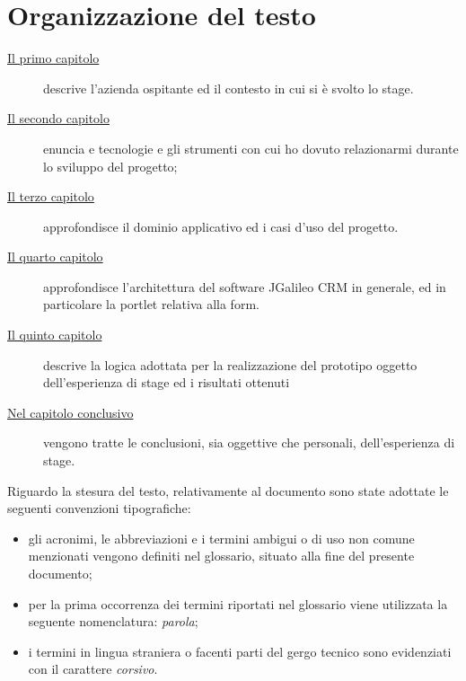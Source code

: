 \cleardoublepage
{}
{}
\begingroup
\let\clearpage\relax
\let\cleardoublepage\relax
\let\cleardoublepage\relax


\chapter*{Organizzazione del testo}

\begin{description}
    \item[{\hyperref[cap:introduzione]{Il primo capitolo}}] descrive l'azienda ospitante ed il contesto in cui si è svolto lo stage.

    \item[{\hyperref[cap:tecnologie-strumenti]{Il secondo capitolo}}] enuncia e tecnologie e gli strumenti con cui ho dovuto relazionarmi durante lo sviluppo del progetto;
    
    \item[{\hyperref[cap:descrizione-stage]{Il terzo capitolo}}] approfondisce il dominio applicativo ed i casi d'uso del progetto.
    
    \item[{\hyperref[cap:progettazione]{Il quarto capitolo}}] approfondisce l'architettura del software JGalileo CRM in generale, ed in particolare la portlet relativa alla form.    
    \item[{\hyperref[cap:sviluppo-prototipo]{Il quinto capitolo}}] descrive la logica adottata per la realizzazione del prototipo oggetto dell'esperienza di stage ed i risultati ottenuti
    \item[{\hyperref[cap:conclusioni]{Nel capitolo conclusivo}}] vengono tratte le conclusioni, sia oggettive che personali, dell'esperienza di stage.
  
\end{description}

Riguardo la stesura del testo, relativamente al documento sono state adottate le seguenti convenzioni tipografiche:
\begin{itemize}
	\item gli acronimi, le abbreviazioni e i termini ambigui o di uso non comune menzionati vengono definiti nel glossario, situato alla fine del presente documento;
	\item per la prima occorrenza dei termini riportati nel glossario viene utilizzata la seguente nomenclatura: \emph{parola}\glsfirstoccur;
	\item i termini in lingua straniera o facenti parti del gergo tecnico sono evidenziati con il carattere \emph{corsivo}.
\end{itemize}